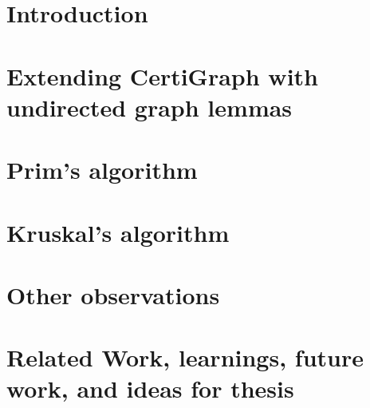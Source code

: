 \documentclass[12pt]{llncs}
\begin{document}



\section{Introduction}
\label{sec:intro}


\section{Extending CertiGraph with undirected graph lemmas}
\label{sec:undirected}


\section{Prim's algorithm}
\label{sec:prim}


\section{Kruskal's algorithm}
\label{sec:kruskal}


\section{Other observations}
\label{sec:other}


\section{Related Work, learnings, future work, and ideas for thesis}
\label{sec:relatedwork}






\end{document}
